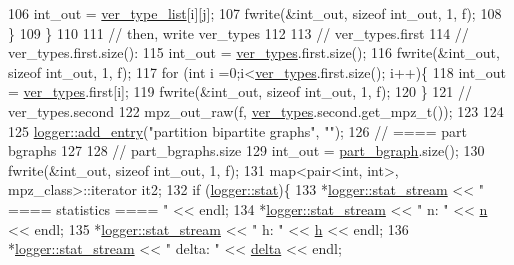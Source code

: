 \begin{DoxyCode}
106       int\_out = \hyperlink{classmarked__graph__compressed_af2e3e55223d436628a02758dfae88493}{ver\_type\_list}[i][j];
107       fwrite(&int\_out, \textcolor{keyword}{sizeof} int\_out, 1, f);
108     \}
109   \}
110 
111   \textcolor{comment}{// then, write ver\_types}
112 
113   \textcolor{comment}{// ver\_types.first}
114   \textcolor{comment}{// ver\_types.first.size():}
115   int\_out = \hyperlink{classmarked__graph__compressed_af446cc5e23c241a92b76642fd5ebc403}{ver\_types}.first.size();
116   fwrite(&int\_out, \textcolor{keyword}{sizeof} int\_out, 1, f);
117   \textcolor{keywordflow}{for} (\textcolor{keywordtype}{int} i =0;i<\hyperlink{classmarked__graph__compressed_af446cc5e23c241a92b76642fd5ebc403}{ver\_types}.first.size(); i++)\{
118     int\_out = \hyperlink{classmarked__graph__compressed_af446cc5e23c241a92b76642fd5ebc403}{ver\_types}.first[i];
119     fwrite(&int\_out, \textcolor{keyword}{sizeof} int\_out, 1, f);
120   \}
121   \textcolor{comment}{// ver\_types.second}
122   mpz\_out\_raw(f, \hyperlink{classmarked__graph__compressed_af446cc5e23c241a92b76642fd5ebc403}{ver\_types}.second.get\_mpz\_t());
123 
124 
125   \hyperlink{classlogger_a710163deb17bc81f70d53d285b8ac9ac}{logger::add\_entry}(\textcolor{stringliteral}{"partition bipartite graphs"}, \textcolor{stringliteral}{""});
126   \textcolor{comment}{// ==== part bgraphs}
127 
128   \textcolor{comment}{// part\_bgraphs.size}
129   int\_out = \hyperlink{classmarked__graph__compressed_a7b3267063fba30b45eb21b3ba4e07536}{part\_bgraph}.size();
130   fwrite(&int\_out, \textcolor{keyword}{sizeof} int\_out, 1, f);
131   map<pair<int, int>, mpz\_class>::iterator it2;
132   \textcolor{keywordflow}{if} (\hyperlink{classlogger_a26812b5ba03f130e8dae3446d5fc032f}{logger::stat})\{
133     *\hyperlink{classlogger_a7db37821f875f2ba3540980b355779f5}{logger::stat\_stream} << \textcolor{stringliteral}{" ==== statistics ==== "} << endl;
134     *\hyperlink{classlogger_a7db37821f875f2ba3540980b355779f5}{logger::stat\_stream} << \textcolor{stringliteral}{" n:                "} << \hyperlink{classmarked__graph__compressed_a8d841016ddb11cfd33748c8deb6277ba}{n} << endl;
135     *\hyperlink{classlogger_a7db37821f875f2ba3540980b355779f5}{logger::stat\_stream} << \textcolor{stringliteral}{" h:                "} << \hyperlink{classmarked__graph__compressed_af6ff623407b673d08d0cab77b39c2193}{h} << endl;
136     *\hyperlink{classlogger_a7db37821f875f2ba3540980b355779f5}{logger::stat\_stream} << \textcolor{stringliteral}{" delta:            "} << \hyperlink{classmarked__graph__compressed_a8b2aaac68e9332ddc78d88eb60b323a7}{delta} << endl;

\end{DoxyCode}
